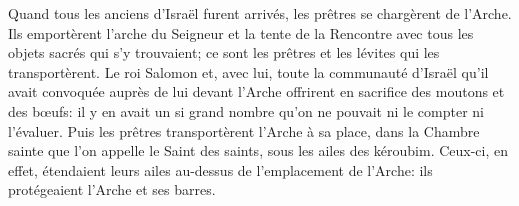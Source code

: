 Quand tous les anciens d’Israël furent arrivés, les prêtres se chargèrent de l’Arche.
Ils emportèrent l’arche du Seigneur et la tente de la Rencontre
	avec tous les objets sacrés qui s’y trouvaient;
	ce sont les prêtres et les lévites qui les transportèrent.
Le roi Salomon et, avec lui, toute la communauté d’Israël
		qu’il avait convoquée auprès de lui devant l’Arche
	offrirent en sacrifice des moutons et des bœufs:
	il y en avait un si grand nombre qu’on ne pouvait ni le compter ni l’évaluer.
Puis les prêtres transportèrent l’Arche à sa place,
	dans la Chambre sainte que l’on appelle le Saint des saints,
	sous les ailes des kéroubim.
Ceux-ci, en effet, étendaient leurs ailes au-dessus de l’emplacement de l’Arche:
	ils protégeaient l’Arche et ses barres.
